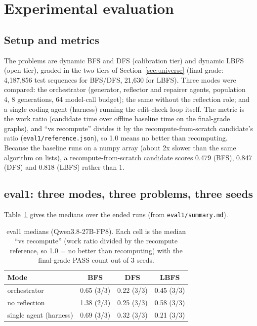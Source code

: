 \section{Experimental evaluation}
\label{sec:test-evaluation}

\subsection{Setup and metrics}

The problems are dynamic BFS and DFS (calibration tier) and dynamic LBFS (open
tier), graded in the two tiers of Section~\ref{sec:universe} (final grade:
4{,}187{,}856 test sequences for BFS/DFS, 21{,}630 for LBFS). Three modes were
compared: the orchestrator (generator,
reflector and repairer agents, population 4, 8 generations, 64 model-call
budget); the same without the reflection role; and a single coding agent
(harness) running the edit-check loop itself. The metric is the work ratio (candidate time over offline baseline time on
the final-grade graphs), and ``vs recompute'' divides it by the
recompute-from-scratch candidate's ratio (\texttt{eval1/reference.json}), so
1.0 means no better than recomputing. Because the baseline runs on a numpy
array (about 2x slower than the same algorithm on lists), a
recompute-from-scratch candidate scores 0.479 (BFS), 0.847 (DFS) and 0.818
(LBFS) rather than 1.

\subsection{eval1: three modes, three problems, three seeds}

Table~\ref{tab:eval1} gives the medians over the ended runs (from
\texttt{eval1/summary.md}).

\begin{table}[H]
\centering
\footnotesize
\caption{eval1 medians (Qwen3.8-27B-FP8). Each cell is the median ``vs
recompute'' (work ratio divided by the recompute reference, so 1.0 = no better
than recomputing) with the final-grade PASS count out of 3 seeds.}
\label{tab:eval1}
\begin{tabular}{@{}lccc@{}}
\toprule
Mode & BFS & DFS & LBFS \\
\midrule
orchestrator & 0.65 (3/3) & 0.22 (3/3) & 0.45 (3/3) \\
no reflection & 1.38 (2/3) & 0.25 (3/3) & 0.58 (3/3) \\
single agent (harness) & 0.69 (3/3) & 0.32 (3/3) & 0.21 (3/3) \\
\bottomrule
\end{tabular}
\end{table}

